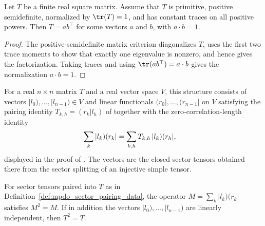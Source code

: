 \begin{lemma}
    \label{thm:psd_trace_powers_rank_one_t}
    \leanok
    Let $T$ be a finite real square matrix. Assume that $T$ is primitive,
    positive semidefinite, normalized by $\tr(T)=1$, and has constant traces on
    all positive powers. Then $T=ab^\top$ for some vectors $a$ and $b$, with
    $a\cdot b=1$.
\end{lemma}

\begin{proof}
    \leanok
    The positive-semidefinite matrix criterion diagonalizes $T$, uses the first
    two trace moments to show that exactly one eigenvalue is nonzero, and hence
    gives the factorization. Taking traces and using
    $\tr(ab^\top)=a\cdot b$ gives the normalization $a\cdot b=1$.
\end{proof}

\begin{definition}
    \label{def:mpdo_sector_pairing_data}
    \leanok
    For a real $n\times n$ matrix $T$ and a real vector space $V$, this
    structure consists of vectors
    $|l_0),\ldots,|l_{n-1})\in V$ and linear functionals
    $(r_0|,\ldots,(r_{n-1}|$ on $V$ satisfying the pairing identity
    $T_{k,h}=(r_k|l_h)$ of
    \cite[Appendix~C.2]{Cirac2016MPDO_arXiv} together with the
    zero-correlation-length identity
    \begin{align}
        \sum_k|l_k)(r_k|
         & =\sum_{k,h}T_{k,h}\,|l_k)(r_h|,
        \notag
    \end{align}
    displayed in the proof of \cite[Lemma~C.5]{Cirac2016MPDO_arXiv}. The
    vectors are the closed sector tensors obtained there from the sector
    splitting of an injective simple tensor.
\end{definition}

\begin{lemma}
    \label{thm:mpdo_sector_pairing_idempotent}
    \leanok
    For sector tensors paired into $T$ as in
    Definition~\ref{def:mpdo_sector_pairing_data}, the operator
    $M=\sum_k|l_k)(r_k|$ satisfies $M^2=M$. If in addition the vectors
    $|l_0),\ldots,|l_{n-1})$ are linearly independent, then $T^2=T$.
\end{lemma}

